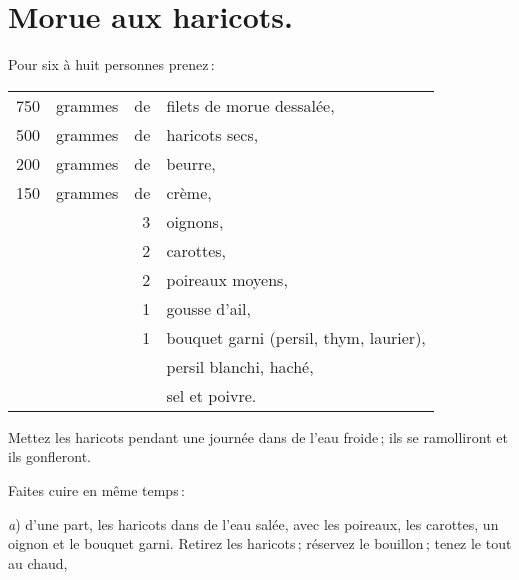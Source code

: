 \section*{\centering Morue aux haricots.}

Pour six à huit personnes prenez :

\medskip

\footnotesize
\begin{longtable}{rrrp{16em}}
    750 & grammes & de & filets de morue dessalée,                                                        \\
    500 & grammes & de & haricots secs,                                                                   \\
    200 & grammes & de & beurre,                                                                          \\
    150 & grammes & de & crème,                                                                           \\
        &         &  3 & oignons,                                                                         \\
        &         &  2 & carottes,                                                                        \\
        &         &  2 & poireaux moyens,                                                                 \\
        &         &  1 & gousse d'ail,                                                                    \\
        &         &  1 & bouquet garni (persil, thym, laurier),                                           \\
        &         &    & persil blanchi, haché,                                                           \\
        &         &    & sel et poivre.                                                                   \\
\end{longtable}
\normalsize

Mettez les haricots pendant une journée dans de l'eau froide ; ils se ramolliront
et ils gonfleront.

Faites cuire en même temps :

\textit{a}) d'une part, les haricots dans de l'eau salée, avec les poireaux,
les carottes, un oignon et le bouquet garni. Retirez les haricots ; réservez le
bouillon ; tenez le tout au chaud,

